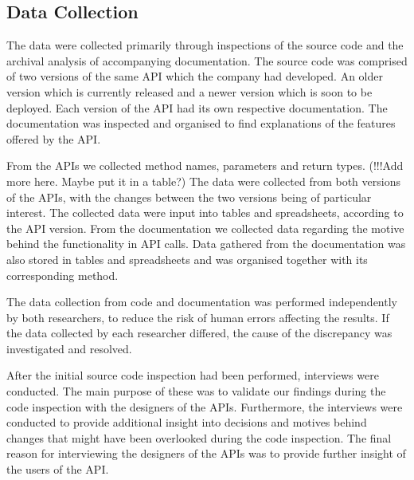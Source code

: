 \documentclass{sig-alternate}
\begin{document}
\subsection{Data Collection} \label{data_collection}
The data were collected primarily through inspections of the source code and the archival analysis of accompanying  documentation. The source code was comprised of two versions of the same API which the company had developed. An older version which is currently released and a newer version which is soon to be deployed. Each version of the API had its own respective documentation. The documentation was inspected and organised to find explanations of the features offered by the API. 

From the APIs we collected method names, parameters and return types. (!!!Add more here. Maybe put it in a table?) The data were collected from both versions of the APIs, with the changes between the two versions being of particular interest. The collected data were input into tables and spreadsheets, according to the API version. From the documentation we collected data regarding the motive behind the functionality in API calls. Data gathered from the documentation was also stored in tables and spreadsheets and was organised together with its corresponding method.

The data collection from code and documentation was performed independently by both researchers, to reduce the risk of human errors affecting the results. If the data collected by each researcher differed, the cause of the discrepancy was investigated and resolved. 

After the initial source code inspection had been performed, interviews were conducted. The main purpose of these was to validate our findings during the code inspection with the designers of the APIs. Furthermore, the interviews were conducted to provide additional insight into decisions and motives behind changes that might have been overlooked during the code inspection. The final reason for interviewing the designers of the APIs was to provide further insight of the users of the API. 
\end{document}
